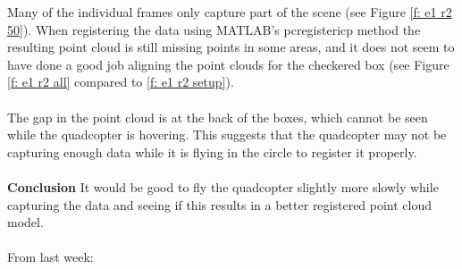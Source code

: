 \documentclass[12pt,a4paper]{article}
\begin{document}
\noindent
Many of the individual frames only capture part of the scene (see Figure \ref{f: e1 r2 50}). When registering the data using MATLAB's pcregistericp method the resulting point cloud is still missing points in some areas, and it does not seem to have done a good job aligning the point clouds for the checkered box (see Figure \ref{f: e1 r2 all} compared to \ref{f: e1 r2 setup}).
\\\\
The gap in the point cloud is at the back of the boxes, which cannot be seen while the quadcopter is hovering. This suggests that the quadcopter may not be capturing enough data while it is flying in the circle to register it properly.
\\\\
\textbf{Conclusion}
It would be good to fly the quadcopter slightly more slowly while capturing the data and seeing if this results in a better registered point cloud model.
\\\\
\newpage
From last week:
\end{document}
